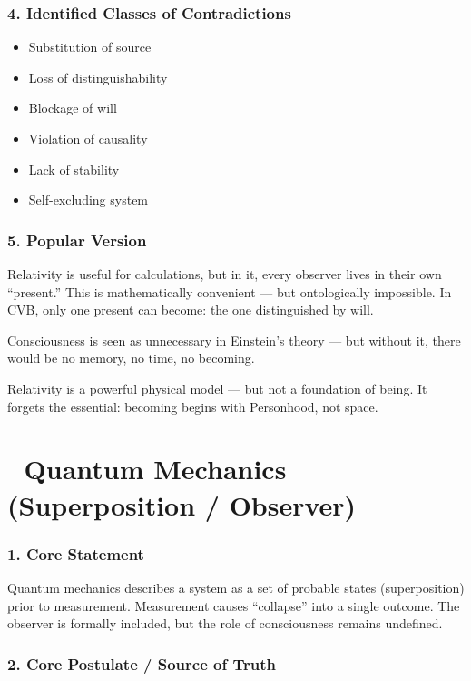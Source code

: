 \documentclass[12pt]{article}
\begin{document}
\subsubsection*{4. Identified Classes of Contradictions}

\begin{itemize}
\item Substitution of source
\item Loss of distinguishability
\item Blockage of will
\item Violation of causality
\item Lack of stability
\item Self-excluding system
\end{itemize}

\subsubsection*{5. Popular Version}

Relativity is useful for calculations, but in it, every observer lives in their own ``present.'' This is mathematically convenient — but ontologically impossible. In CVB, only one present can become: the one distinguished by will.

Consciousness is seen as unnecessary in Einstein’s theory — but without it, there would be no memory, no time, no becoming.

Relativity is a powerful physical model — but not a foundation of being. It forgets the essential: becoming begins with Personhood, not space.

\section*{🔷 Quantum Mechanics (Superposition / Observer)}

\subsubsection*{1. Core Statement}

Quantum mechanics describes a system as a set of probable states (superposition) prior to measurement. Measurement causes ``collapse'' into a single outcome. The observer is formally included, but the role of consciousness remains undefined.

\subsubsection*{2. Core Postulate / Source of Truth}
\end{document}
